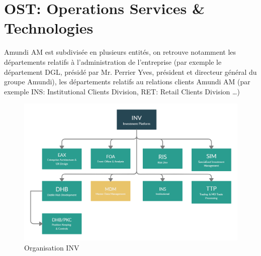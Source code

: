 \section{OST: Operations Services \& Technologies}
\par Amundi AM est subdivisée en plusieurs entités, on retrouve notamment les départements relatifs à l'administration de l'entreprise (par exemple le département DGL, présidé par Mr. Perrier Yves, président et directeur général du groupe Amundi), les départements relatifs au relations clients Amundi AM (par exemple INS: Institutional Clients Division, RET: Retail Clients Division \dots)
\begin{figure}[ht]
    \includegraphics[width=\columnwidth]{img/Org INV.png}
    \caption{Organisation INV}
\end{figure}